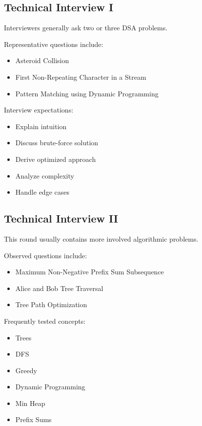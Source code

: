 \documentclass[11pt,a4paper]{article}
\begin{document}

\subsection{Technical Interview I}

Interviewers generally ask two or three DSA problems.

Representative questions include:

\begin{itemize}
	\item Asteroid Collision
	\item First Non-Repeating Character in a Stream
	\item Pattern Matching using Dynamic Programming
\end{itemize}

Interview expectations:

\begin{itemize}
	\item Explain intuition
	\item Discuss brute-force solution
	\item Derive optimized approach
	\item Analyze complexity
	\item Handle edge cases
\end{itemize}


\subsection{Technical Interview II}

This round usually contains more involved algorithmic problems.

Observed questions include:

\begin{itemize}
	\item Maximum Non-Negative Prefix Sum Subsequence
	\item Alice and Bob Tree Traversal
	\item Tree Path Optimization
\end{itemize}

Frequently tested concepts:

\begin{itemize}
	\item Trees
	\item DFS
	\item Greedy
	\item Dynamic Programming
	\item Min Heap
	\item Prefix Sums
\end{itemize}
\end{document}
